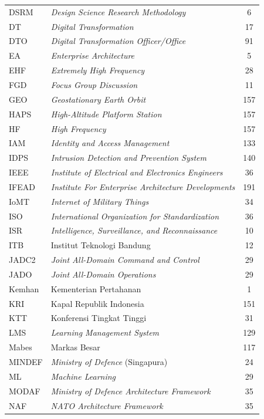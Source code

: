 \begin{longtable}{@{} l >{\raggedright\arraybackslash}p{7.5cm} c @{}}
DSRM & \textit{Design Science Research Methodology} & 6 \\
DT & \textit{Digital Transformation} & 17 \\
DTO & \textit{Digital Transformation Officer/Office} & 91 \\
EA & \textit{Enterprise Architecture} & 5 \\
EHF & \textit{Extremely High Frequency} & 28 \\
FGD & \textit{Focus Group Discussion} & 11 \\
GEO & \textit{Geostationary Earth Orbit} & 157 \\
HAPS & \textit{High-Altitude Platform Station} & 157 \\
HF & \textit{High Frequency} & 157 \\
IAM & \textit{Identity and Access Management} & 133 \\
IDPS & \textit{Intrusion Detection and Prevention System} & 140 \\
IEEE & \textit{Institute of Electrical and Electronics Engineers} & 36 \\
IFEAD & \textit{Institute For Enterprise Architecture Developments} & 191 \\
IoMT & \textit{Internet of Military Things} & 34 \\
ISO & \textit{International Organization for Standardization} & 36 \\
ISR & \textit{Intelligence, Surveillance, and Reconnaissance} & 10 \\
ITB & Institut Teknologi Bandung & 12 \\
JADC2 & \textit{Joint All-Domain Command and Control} & 29 \\
JADO & \textit{Joint All-Domain Operations} & 29 \\
Kemhan & Kementerian Pertahanan & 1 \\
KRI & Kapal Republik Indonesia & 151 \\
KTT & Konferensi Tingkat Tinggi & 31 \\
LMS & \textit{Learning Management System} & 129 \\
Mabes & Markas Besar & 117 \\
MINDEF & \textit{Ministry of Defence} (Singapura) & 24 \\
ML & \textit{Machine Learning} & 29 \\
MODAF & \textit{Ministry of Defence Architecture Framework} & 35 \\
NAF & \textit{NATO Architecture Framework} & 35 \\

\end{longtable}
